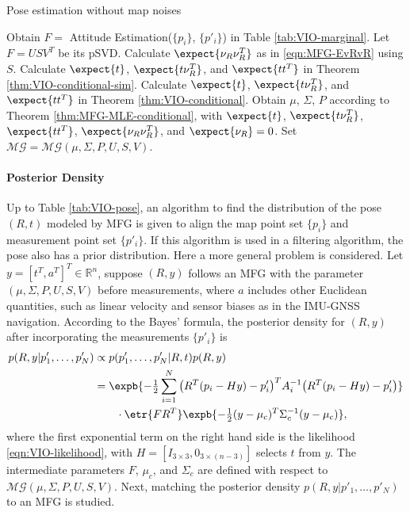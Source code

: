 \begin{table}
	\caption{Pose estimation without map noises}
	\label{tab:VIO-pose}
	\begin{algorithmic}[1]
		\algrule[0.8pt]
		\algrule
		\State Obtain $F=$ Attitude Estimation($\{p_i\}$, $\{p'_i\}$) in Table \ref{tab:VIO-marginal}.
		\State Let $F = USV^T$ be its pSVD.
		\State Calculate $\expect{\nu_R\nu_R^T}$ as in \eqref{eqn:MFG-EvRvR} using $S$.
		\State Calculate $\expect{t}$, $\expect{t\nu_R^T}$, and $\expect{tt^T}$ in Theorem \ref{thm:VIO-conditional-sim}.
		\Else
		\State Calculate $\expect{t}$, $\expect{t\nu_R^T}$, and $\expect{tt^T}$ in Theorem \ref{thm:VIO-conditional}.
		\EndIf
		\State Obtain $\mu$, $\Sigma$, $P$ according to Theorem \ref{thm:MFG-MLE-conditional}, with $\expect{t}$, $\expect{t\nu_R^T}$, $\expect{tt^T}$, $\expect{\nu_R\nu_R^T}$, and $\expect{\nu_R} = 0$.
		\State Set $\mathcal{MG} = \mathcal{MG}(\mu,\Sigma,P,U,S,V)$.
		\EndProcedure
		\algrule[0.8pt]
	\end{algorithmic}
\end{table}

\paragraph{Posterior Density}

Up to Table \eqref{tab:VIO-pose}, an algorithm to find the distribution of the pose $(R,t)$ modeled by MFG is given to align the map point set $\{p_i\}$ and measurement point set $\{p'_i\}$.
If this algorithm is used in a filtering algorithm, the pose also has a prior distribution.
Here a more general problem is considered.
Let $y = [t^T, a^T]^T \in \mathbb{R}^n$, suppose $(R,y)$ follows an MFG with the parameter $(\mu,\Sigma,P,U,S,V)$ before measurements, where $a$ includes other Euclidean quantities, such as linear velocity and sensor biases as in the IMU-GNSS navigation.
According to the Bayes' formula, the posterior density for $(R,y)$ after incorporating the measurements $\{p'_i\}$ is
\begin{align} \label{eqn:VIO-posterior}
	p(R,y|p'_1,\ldots,p'_N) &\propto p(p'_1,\ldots,p'_N|R,t) p(R,y) \nonumber \\
	&= \expb{-\tfrac{1}{2}\sum_{i=1}^N \big(R^T(p_i-Hy)-p'_i\big)^T A_i^{-1} \big(R^T(p_i-Hy)-p'_i\big)} \nonumber \\
	&\qquad \cdot \etr{FR^T} \expb{-\tfrac{1}{2}(y-\mu_c)^T \Sigma_c^{-1} (y-\mu_c)},
\end{align}
where the first exponential term on the right hand side is the likelihood \eqref{eqn:VIO-likelihood}, with $H = [I_{3\times 3}, 0_{3\times (n-3)}]$ selects $t$ from $y$.
The intermediate parameters $F$, $\mu_c$, and $\Sigma_c$ are defined with respect to $\mathcal{MG}(\mu,\Sigma,P,U,S,V)$.
Next, matching the posterior density $p(R,y|p'_1,\ldots,p'_N)$ to an MFG is studied.

